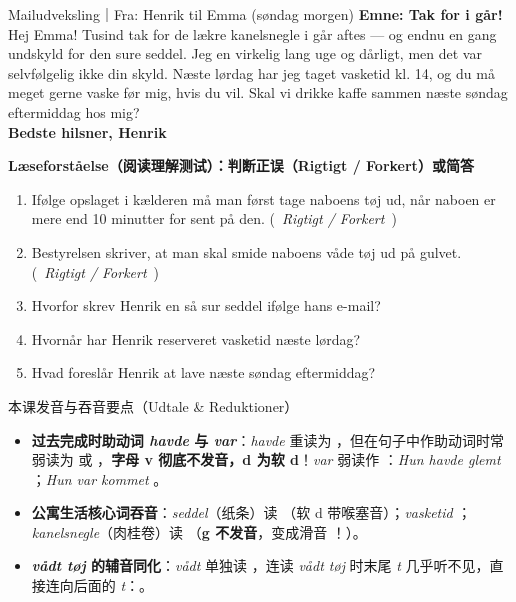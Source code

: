 \begin{emailbox}{Mailudveksling｜Fra: Henrik til Emma (søndag morgen)}
\textbf{Emne: Tak for i går!}\\
Hej Emma! Tusind tak for de lækre kanelsnegle i går aftes --- og endnu en gang undskyld for den sure seddel. Jeg  en virkelig lang uge og  dårligt, men det var selvfølgelig ikke din skyld. Næste lørdag har jeg taget vasketid kl. 14, og du må meget gerne vaske før mig, hvis du vil. Skal vi drikke kaffe sammen næste søndag eftermiddag hos mig?\\
\textbf{Bedste hilsner, Henrik}
\end{emailbox}

\textbf{Læseforståelse（阅读理解测试）：判断正误（Rigtigt / Forkert）或简答}
\begin{enumerate}
  \item Ifølge opslaget i kælderen må man først tage naboens tøj ud, når naboen er mere end 10 minutter for sent på den. \quad (\ \textit{Rigtigt / Forkert}\ )
  \item Bestyrelsen skriver, at man skal smide naboens våde tøj ud på gulvet. \quad (\ \textit{Rigtigt / Forkert}\ )
  \item Hvorfor skrev Henrik en så sur seddel ifølge hans e-mail? \quad \underline{\hspace{5.5cm}}
  \item Hvornår har Henrik reserveret vasketid næste lørdag? \quad \underline{\hspace{4.5cm}}
  \item Hvad foreslår Henrik at lave næste søndag eftermiddag? \quad \underline{\hspace{5.5cm}}
\end{enumerate}

\begin{tipbox}{本课发音与吞音要点（Udtale \& Reduktioner）}
\begin{itemize}
  \item \textbf{过去完成时助动词 \textit{havde} 与 \textit{var}}：\textit{havde} 重读为 ，但在句子中作助动词时常弱读为  或 ，\textbf{字母 v 彻底不发音，d 为软 d}！\textit{var} 弱读作 ：\textit{Hun havde glemt} ；\textit{Hun var kommet} 。
  \item \textbf{公寓生活核心词吞音}：\textit{seddel}（纸条）读 （软 d 带喉塞音）；\textit{vasketid} ；\textit{kanelsnegle}（肉桂卷）读 （\textbf{g 不发音}，变成滑音 ！）。
  \item \textbf{\textit{vådt tøj} 的辅音同化}：\textit{vådt} 单独读 ，连读 \textit{vådt tøj} 时末尾 \textit{t} 几乎听不见，直接连向后面的 \textit{t}：。
\end{itemize}
\end{tipbox}

